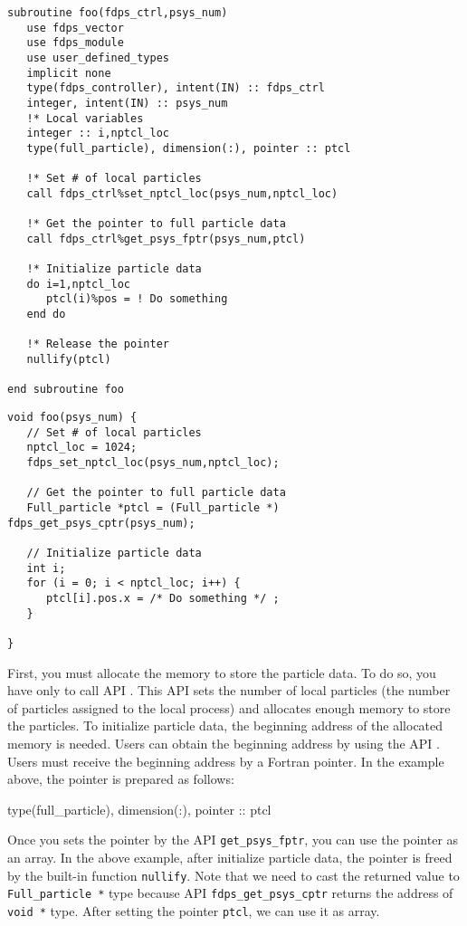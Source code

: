 \ifFtn %
\begin{lstlisting}[caption=Initialization of particle data]
subroutine foo(fdps_ctrl,psys_num)
   use fdps_vector
   use fdps_module
   use user_defined_types
   implicit none
   type(fdps_controller), intent(IN) :: fdps_ctrl
   integer, intent(IN) :: psys_num
   !* Local variables
   integer :: i,nptcl_loc
   type(full_particle), dimension(:), pointer :: ptcl

   !* Set # of local particles
   call fdps_ctrl%set_nptcl_loc(psys_num,nptcl_loc)

   !* Get the pointer to full particle data
   call fdps_ctrl%get_psys_fptr(psys_num,ptcl)
   
   !* Initialize particle data
   do i=1,nptcl_loc
      ptcl(i)%pos = ! Do something
   end do
   
   !* Release the pointer
   nullify(ptcl)

end subroutine foo
\end{lstlisting}
\endifFtn
\ifC %
\begin{lstlisting}[caption=Initialization of particle data]
void foo(psys_num) {
   // Set # of local particles
   nptcl_loc = 1024; 
   fdps_set_nptcl_loc(psys_num,nptcl_loc);

   // Get the pointer to full particle data
   Full_particle *ptcl = (Full_particle *)  fdps_get_psys_cptr(psys_num);
   
   // Initialize particle data
   int i;
   for (i = 0; i < nptcl_loc; i++) {
      ptcl[i].pos.x = /* Do something */ ;
   }
   
}
\end{lstlisting}
\endifC

First, you must allocate the memory to store the particle data. To do so, you have only to call API . This API sets the number of local particles (the number of particles assigned to the local process) and allocates enough memory to store the particles. To initialize particle data, the beginning address of the allocated memory is needed. Users can obtain the beginning address by using the API . 
\ifFtn %
Users must receive the beginning address by a Fortran pointer. In the example above, the pointer is prepared as follows:
\begin{screen}
\begin{spverbatim}
type(full_particle), dimension(:), pointer :: ptcl
\end{spverbatim}  
\end{screen}
Once you sets the pointer by the API \texttt{get\_psys\_fptr}, you can use the pointer as an array. In the above example, after initialize particle data, the pointer is freed by the built-in function \texttt{nullify}.
\endifFtn
\ifC %
Note that we need to cast the returned value to \texttt{Full\_particle *} type because API \texttt{fdps\_get\_psys\_cptr} returns the address of \texttt{void *} type. After setting the pointer \texttt{ptcl}, we can use it  as array.
\endifC
\endifIF


